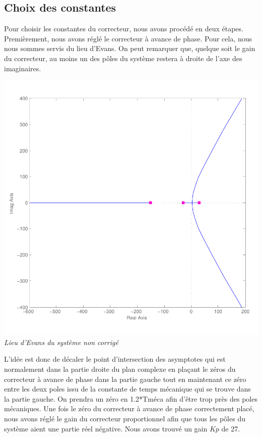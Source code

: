 \documentclass[11pt, french]{article} %
\begin{document}
\subsection{Choix des constantes}

Pour choisir les constantes du correcteur, nous avons procédé en deux étapes. Premièrement, nous avons réglé le correcteur à avance de phase. Pour cela, nous nous sommes servis du lieu d'Evans. On peut remarquer que, quelque soit le gain du correcteur, au moins un des pôles du système restera à droite de l'axe des imaginaires.

\begin{center}
\includegraphics [scale=0.50]{RL_Sys_Seul.pdf}\\
\vspace{-10pt}
\emph{Lieu d'Evans du système non corrigé}
\end{center}

L'idée est donc de décaler le point d'intersection des asymptotes qui est normalement dans la partie droite du plan complexe en plaçant le zéros du correcteur à avance de phase dans la partie gauche tout en maintenant ce zéro entre les deux poles issu de la constante de temps mécanique qui se trouve dans la partie gauche. On prendra un zéro en 1.2*Tméca afin d'être trop près des poles mécaniques. Une fois le zéro du correcteur à avance de phase correctement placé, nous avons réglé le gain du correcteur proportionnel afin que tous les pôles du système aient une partie réel négative. Nous avons trouvé un gain $Kp$ de 27. 
\end{document}

